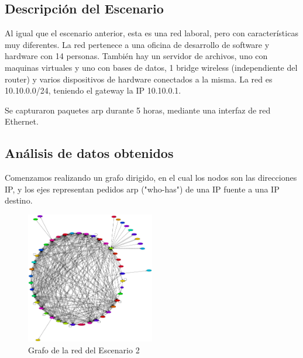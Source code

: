 \subsection{Descripci\'on del Escenario}
	\par Al igual que el escenario anterior, esta es una red laboral, pero con características muy diferentes. La red pertenece a una oficina de desarrollo de software y hardware con 14 personas. También hay un servidor de archivos, uno con maquinas virtuales y uno con bases de datos, 1 bridge wireless (independiente del router) y varios dispositivos de hardware conectados a la misma. La red es 10.10.0.0/24, teniendo el gateway la IP 10.10.0.1. 
	 \par Se capturaron paquetes arp durante 5 horas, mediante una interfaz de red Ethernet.
     
\subsection{An\'alisis de datos obtenidos}
	\par Comenzamos realizando un grafo dirigido, en el cual los nodos son las direcciones IP, y los ejes representan pedidos arp ("who-has") de una IP fuente a una IP destino.
	\begin{figure}[H]
		\centering
		\includegraphics[width=0.5\textwidth]{img/graph/escenario_2/grafico_de_la_red.eps}
		\caption{Grafo de la red del Escenario 2}
		\label{fig:grafo_escenario2}
	\end{figure}
    
